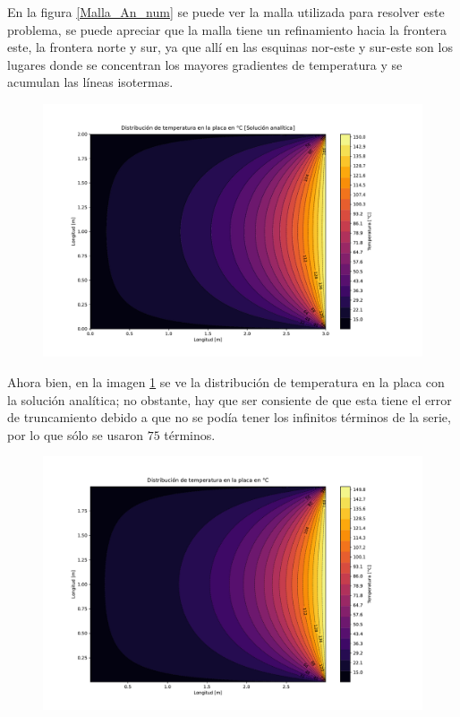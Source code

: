 \documentclass[article,latterpaper]{article}
\begin{document}
En la figura \ref{Malla_An_num} se puede ver la malla utilizada para resolver este problema, se puede apreciar que la malla tiene un refinamiento hacia la frontera este, la frontera norte y sur, ya que allí en las esquinas nor-este y sur-este son los lugares donde se concentran los mayores gradientes de temperatura y se acumulan las líneas isotermas.

\begin{figure}[H]
    \centering
    \includegraphics[scale=0.25]{Caso_analitico/Dist_T_An.pdf}
    \caption{ }
    \label{T_Sol_An}
\end{figure}

Ahora bien, en la imagen \ref{T_Sol_An} se ve la distribución de temperatura en la placa con la solución analítica; no obstante, hay que ser consiente de que esta tiene el error de truncamiento debido a que no se podía tener los infinitos términos de la serie, por lo que sólo se usaron $75$ términos.

\begin{figure}[H]
    \centering
    \includegraphics[scale=0.25]{Caso_analitico/Dist_T.pdf}
    \caption{ }
    \label{T_Sol_An_num}
\end{figure}
\end{document}
